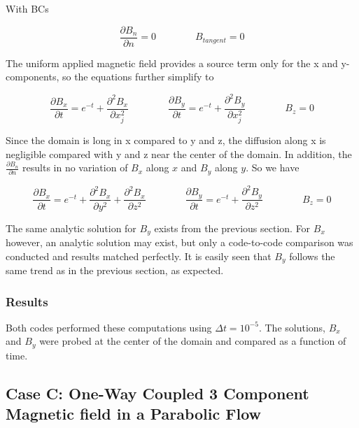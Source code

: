 \documentclass[11pt]{article}
\newcommand{\figS}{22.1em}
\newcommand{\figH}{\figS}
\newcommand{\figW}{\figS}
\begin{document}
With BCs

\begin{equation}
	\frac{\partial B_{n}}{\partial n} = 0
	\qquad \qquad
	B_{tangent} = 0
\end{equation}

The uniform applied magnetic field provides a source term only for the x and y-components, so the equations further simplify to

\begin{equation}
	\frac{\partial B_x}{\partial t} 
	=
	e^{-t}
	+
	\frac{\partial^2 B_x}{\partial x_j^2} 
	\qquad \qquad
	\frac{\partial B_y}{\partial t} 
	=
	e^{-t}
	+
	\frac{\partial^2 B_y}{\partial x_j^2} 
	\qquad \qquad
	B_z = 0
\end{equation}

Since the domain is long in x compared to y and z, the diffusion along x is negligible compared with y and z near the center of the domain. In addition, the $\frac{\partial B_n}{\partial n}$ results in no variation of $B_x$ along $x$ and $B_y$ along $y$. So we have

\begin{equation}
	\frac{\partial B_x}{\partial t} 
	=
	e^{-t}
	+
	\frac{\partial^2 B_x}{\partial y^2} 
	+
	\frac{\partial^2 B_x}{\partial z^2} 
	\qquad \qquad
	\frac{\partial B_y}{\partial t} 
	=
	e^{-t}
	+
	\frac{\partial^2 B_y}{\partial z^2} 
	\qquad \qquad
	B_z = 0
\end{equation}

The same analytic solution for $B_y$ exists from the previous section. For $B_x$ however, an analytic solution may exist, but only a code-to-code comparison was conducted and results matched perfectly. It is easily seen that $B_y$ follows the same trend as in the previous section, as expected.

\subsubsection{Results}
Both codes performed these computations using $\Delta t = 10^{-5}$. The solutions, $B_x$ and $B_y$ were probed at the center of the domain and compared as a function of time.

\begin{figure}[H]
 \centering
   \caption[Optional ]{}
\end{figure}


\subsection{Case C: One-Way Coupled 3 Component Magnetic field in a Parabolic Flow}
\end{document}
